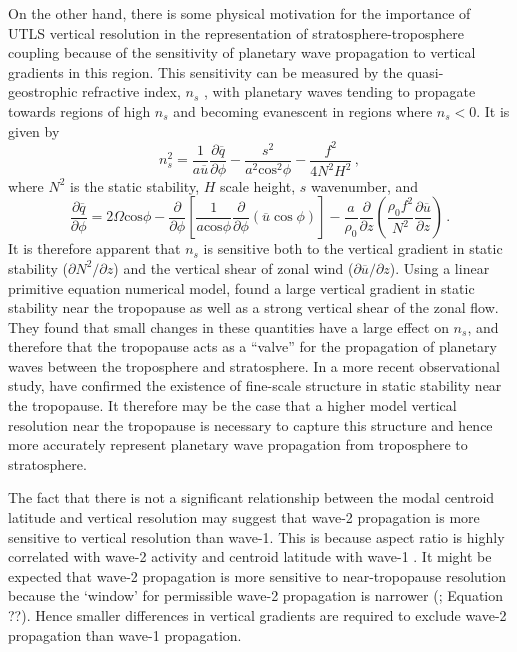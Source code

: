 On the other hand, there is some physical motivation for the importance of UTLS
vertical resolution in the representation of stratosphere-troposphere coupling
because of the sensitivity of planetary wave propagation to vertical gradients
in this region. This sensitivity can be measured by the quasi-geostrophic
refractive index, $n_{s}$ \citep{Matsuno1970}, with planetary waves tending to
propagate towards regions of high $n_{s}$ and becoming evanescent in regions
where $n_{s}<0$. It is given by
\begin{equation}
  n_{s}^{2} = \frac{1}{a\overline{u}}\frac{\partial\overline{q}}{\partial\phi} -
  \frac{s^{2}}{a^{2}\mathrm{cos}^{2}\phi} - \frac{f^{2}}{4N^{2}H^{2}} \, ,
\label{eq:refractive_index}
\end{equation}
where $N^{2}$ is the static stability, $H$ scale height, $s$ wavenumber, and
\begin{equation}
  \frac{\partial\overline{q}}{\partial\phi} = 2\Omega\mathrm{cos}\phi - \frac{\partial}{\partial\phi}\left[
    \frac{1}{a\mathrm{cos}\phi}\frac{\partial}{\partial\phi}(\overline{u}\cos\phi) \right] -
  \frac{a}{\rho_{0}}\frac{\partial}{\partial
    z}\left(\frac{\rho_{0}f^{2}}{N^{2}}\frac{\partial\overline{u}}{\partial z}\right)
  \, .
\end{equation}
It is therefore apparent that $n_{s}$ is sensitive both to the vertical gradient
in static stability ($\partial N^2/\partial z$) and the vertical shear of zonal
wind ($\partial\overline{u}/\partial z$). Using a linear primitive equation
numerical model, \citet{Chen1992} found a large vertical gradient in static
stability near the tropopause as well as a strong vertical shear of the zonal
flow. They found that small changes in these quantities have a large effect on
$n_{s}$, and therefore that the tropopause acts as a ``valve'' for the
propagation of planetary waves between the troposphere and stratosphere. In a
more recent observational study, \citet{Grise2010} have confirmed the existence
of fine-scale structure in static stability near the tropopause. It therefore
may be the case that a higher model vertical resolution near the tropopause is
necessary to capture this structure and hence more accurately represent
planetary wave propagation from troposphere to stratosphere.

The fact that there is not a significant relationship between the modal centroid
latitude and vertical resolution may suggest that wave-2 propagation is more
sensitive to vertical resolution than wave-1. This is because aspect ratio is
highly correlated with wave-2 activity and centroid latitude with wave-1
\citep{Waugh1999}. It might be expected that wave-2 propagation is more
sensitive to near-tropopause resolution because the `window' for permissible
wave-2 propagation is narrower (\citet{Charney1961}; Equation ??). Hence
smaller differences in vertical gradients are required to exclude wave-2
propagation than wave-1 propagation.

